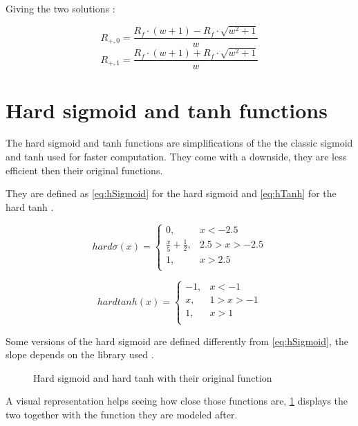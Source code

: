Giving the two solutions :

\begin{equation}\label{eq:wei2res62}
  R_{+,0}=\frac{R_f\cdot(w+1)-R_f\cdot\sqrt{w^2+1}}{w}
\end{equation}
\begin{equation}\label{eq:wei2res63}
  R_{+,1}=\frac{R_f\cdot(w+1)+R_f\cdot\sqrt{w^2+1}}{w}
\end{equation}

\section{Hard sigmoid and \ac{tanh} functions}\label{apsec:hardFunc}

The hard sigmoid and \ac{tanh} functions are simplifications of the the classic sigmoid and \ac{tanh} used for faster computation. They come with a downside, they are less efficient then their original functions.

They are defined as \cref{eq:hSigmoid} for the hard sigmoid and \cref{eq:hTanh} for the hard \ac{tanh} \cite{hSigmoid, hTanh}.


\begin{equation}\label{eq:hSigmoid}
  hard\sigma (x) =
  \begin{cases}
    0,& x< -2.5\\
    \frac{x}{5}+\frac{1}{2},&  2.5>x>-2.5\\
    1,& x> 2.5\\
  \end{cases}
\end{equation}

\begin{equation}\label{eq:hTanh}
  hardtanh(x) =
  \begin{cases}
    -1,& x<-1\\
    x,& 1>x>-1\\
    1,& x>1\\
  \end{cases}
\end{equation}

Some versions of the hard sigmoid are defined differently from \cref{eq:hSigmoid}, the slope depends on the library used \cite{hSigmoid1}.

\begin{figure}[H]
  \centering
  
  \caption{Hard sigmoid and hard \acs{tanh} with their original function}
  \label{graph:hardFunc}
\end{figure}

A visual representation helps seeing how close those functions are, \cref{graph:hardFunc} displays the two together with the function they are modeled after.

\cleardoublepage
